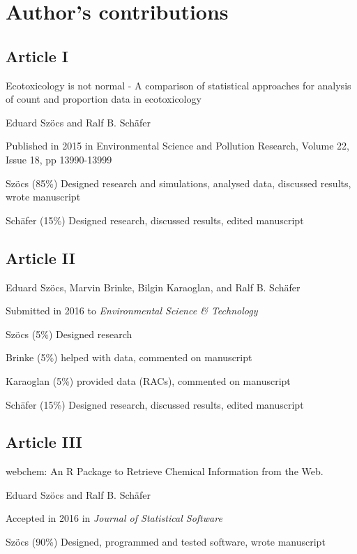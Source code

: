 \chapter{Author's contributions}

\begin{sloppypar}
\section*{Article I}
\small
\begin{description}
    \setlength\itemsep{0.3em}
	\item[Title:] Ecotoxicology is not normal - A comparison of statistical approaches for analysis of count and proportion data in ecotoxicology
	\item[Authors:] Eduard Szöcs and Ralf B. Schäfer
	\item[Status:] Published in 2015 in Environmental Science and Pollution Research, Volume 22, Issue 18, pp 13990-13999
	\item[Contributions:] Szöcs (85\%) Designed research and simulations, analysed data, discussed results, wrote manuscript 

	Schäfer (15\%) Designed research, discussed results, edited manuscript
\end{description}
\normalsize


\section*{Article II}
\small
\begin{description}
    \setlength\itemsep{0.3em}
	\item[Title:]
	\item[Authors:] Eduard Szöcs, Marvin Brinke, Bilgin Karaoglan, and Ralf B. Schäfer
	\item[Status:] Submitted in 2016 to \emph{Environmental Science \& Technology}
	\item[Contributions:] Szöcs (5\%) Designed research

	Brinke (5\%) helped with data, commented on manuscript

	Karaoglan (5\%) provided data (RACs), commented on manuscript

	Schäfer (15\%) Designed research, discussed results, edited manuscript
\end{description}
\normalsize


\section*{Article III}
\small
\begin{description}
    \setlength\itemsep{0.3em}
	\item[Title:] webchem: An R Package to Retrieve Chemical Information from the Web.
	\item[Authors:] Eduard Szöcs and Ralf B. Schäfer
	\item[Status:] Accepted in 2016 in \emph{Journal of Statistical Software}
	\item[Contributions:] Szöcs (90\%) Designed, programmed and tested software, wrote manuscript


\end{description}
\end{sloppypar}
